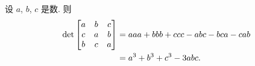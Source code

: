 \documentclass[../libro.tex]{subfiles}
\begin{document}
\begin{figure}[h!]
\end{figure}


\begin{example}
    设 \(a\), \(b\), \(c\) 是数.
    则
    \begin{align*}
         \det
        \begin{bmatrix}
            a & b & c \\
            c & a & b \\
            b & c & a \\
        \end{bmatrix} 
        = {} &
        a a a + b b b + c c c
        - a b c - b c a - c a b
        \\
        = {} &
        a^3 + b^3 + c^3 - 3 a b c.
        \qedhere
    \end{align*}
\end{example}
\end{document}
